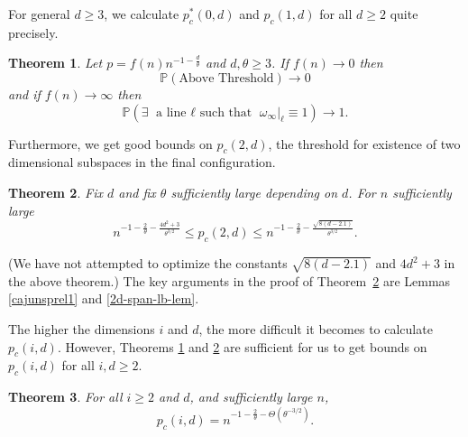 \documentclass{amsart}
\newcommand{\prob}{\mathbb{P}}
\newcommand{\threshold}{\theta}
\newcommand{\abovethresh}{\text{Above Threshold}}
\numberwithin{equation}{section}
\newcommand{\Ln}{\ell}
\newtheorem{theorem}{Theorem}[section]
\theoremstyle{definition}
\theoremstyle{remark}
\begin{document}
For general $d\ge 3$, 
we calculate $p_c^*(0,d)$ and $p_c(1,d)$ for all $d\geq 2$ quite
precisely.
\begin{theorem} \label{la liga}
Let $p=f(n)n^{-1-\frac{d}{\threshold}}$ and $d,\threshold \geq 3$.
If $f(n)\to 0$ then $$\prob(\abovethresh) \to 0$$
and
if $f(n)\to \infty$ then $$\prob(\exists \text{ a line $\Ln$ such that } \omega_\infty|_\Ln\equiv1) \to 1.$$
\end{theorem}

Furthermore, we get good bounds on 
$p_c(2,d)$, the threshold for existence of two dimensional subspaces in the final configuration.
\begin{theorem} \label{epl} Fix $d$ and fix $\threshold$ sufficiently large depending on $d$. For $n$ sufficiently large 
$$n^{-1 - \frac{2}{\threshold} - \frac{4d^2 + 3}{\threshold^{3/2}}}
\leq p_c(2,d) \leq
n^{-1 - \frac{2}{\threshold} - \frac{\sqrt{8(d-2.1)}}{\threshold^{3/2}}}.
$$
\end{theorem}
(We have not attempted to optimize the constants $\sqrt{8(d-2.1)}$ and $4d^2 + 3$ in the above theorem.)
The key arguments in the proof of Theorem~\ref{epl} are Lemmas \ref{cajunsprel1} and \ref{2d-span-lb-lem}.

The higher the dimensions $i$ and $d$, 
the more difficult it becomes to calculate $p_c(i,d)$. 
However, Theorems \ref{la liga}  and \ref{epl} are sufficient for us to get bounds on $p_c(i,d)$ for all $i,d \geq 2$.

\begin{theorem}
For all $i\ge 2$ and $d$, and sufficiently large $n$,
$$p_c(i,d)=n^{-1 - \frac{2}{\threshold} - \Theta(\threshold^{-3/2})}.$$
\end{theorem}
\end{document}
